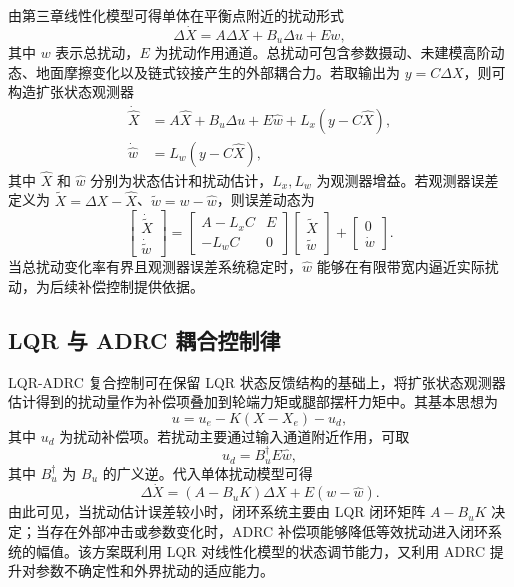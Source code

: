 \documentclass[type=bachelor]{bithesis}
\begin{document}
由第三章线性化模型可得单体在平衡点附近的扰动形式
\begin{equation}
  \Delta\dot{X}=A\Delta X+B_u\Delta u+Ew ,
\end{equation}
其中 $w$ 表示总扰动，$E$ 为扰动作用通道。总扰动可包含参数摄动、未建模高阶动态、地面摩擦变化以及链式铰接产生的外部耦合力。若取输出为 $y=C\Delta X$，则可构造扩张状态观测器
\begin{equation}
\begin{aligned}
  \dot{\hat{X}}&=A\hat{X}+B_u\Delta u+E\hat{w}
  +L_x(y-C\hat{X}),\\
  \dot{\hat{w}}&=L_w(y-C\hat{X}),
\end{aligned}
\end{equation}
其中 $\hat{X}$ 和 $\hat{w}$ 分别为状态估计和扰动估计，$L_x,L_w$ 为观测器增益。若观测器误差定义为 $\tilde{X}=\Delta X-\hat{X}$、$\tilde{w}=w-\hat{w}$，则误差动态为
\begin{equation}
\begin{bmatrix}
  \dot{\tilde{X}}\\
  \dot{\tilde{w}}
\end{bmatrix}
=
\begin{bmatrix}
  A-L_xC & E\\
  -L_wC & 0
\end{bmatrix}
\begin{bmatrix}
  \tilde{X}\\
  \tilde{w}
\end{bmatrix}
+
\begin{bmatrix}
  0\\
  \dot{w}
\end{bmatrix}.
\end{equation}
当总扰动变化率有界且观测器误差系统稳定时，$\hat{w}$ 能够在有限带宽内逼近实际扰动，为后续补偿控制提供依据。

\subsection{LQR 与 ADRC 耦合控制律}
LQR-ADRC 复合控制可在保留 LQR 状态反馈结构的基础上，将扩张状态观测器估计得到的扰动量作为补偿项叠加到轮端力矩或腿部摆杆力矩中。其基本思想为
\begin{equation}
  u=u_e-K(X-X_e)-u_d ,
\end{equation}
其中 $u_d$ 为扰动补偿项。若扰动主要通过输入通道附近作用，可取
\begin{equation}
  u_d=B_u^\dagger E\hat{w},
\end{equation}
其中 $B_u^\dagger$ 为 $B_u$ 的广义逆。代入单体扰动模型可得
\begin{equation}
  \Delta\dot{X}
  =(A-B_uK)\Delta X+E(w-\hat{w}) .
\end{equation}
由此可见，当扰动估计误差较小时，闭环系统主要由 LQR 闭环矩阵 $A-B_uK$ 决定；当存在外部冲击或参数变化时，ADRC 补偿项能够降低等效扰动进入闭环系统的幅值。该方案既利用 LQR 对线性化模型的状态调节能力，又利用 ADRC 提升对参数不确定性和外界扰动的适应能力。
\end{document}
